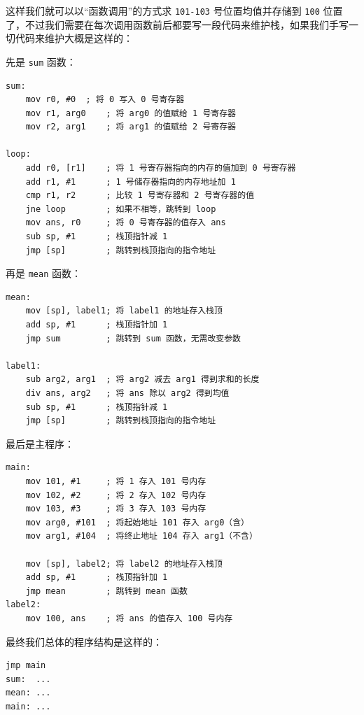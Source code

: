 这样我们就可以以“函数调用”的方式求 \texttt{101-103} 号位置均值并存储到 \texttt{100} 位置了，不过我们需要在每次调用函数前后都要写一段代码来维护栈，如果我们手写一切代码来维护大概是这样的：

先是 \texttt{sum} 函数：
\begin{verbatim}
sum:
    mov r0, #0  ; 将 0 写入 0 号寄存器
    mov r1, arg0    ; 将 arg0 的值赋给 1 号寄存器
    mov r2, arg1    ; 将 arg1 的值赋给 2 号寄存器

loop:
    add r0, [r1]    ; 将 1 号寄存器指向的内存的值加到 0 号寄存器
    add r1, #1      ; 1 号储存器指向的内存地址加 1
    cmp r1, r2      ; 比较 1 号寄存器和 2 号寄存器的值
    jne loop        ; 如果不相等，跳转到 loop
    mov ans, r0     ; 将 0 号寄存器的值存入 ans
    sub sp, #1      ; 栈顶指针减 1
    jmp [sp]        ; 跳转到栈顶指向的指令地址
\end{verbatim}

再是 \texttt{mean} 函数：
\begin{verbatim}
mean:
    mov [sp], label1; 将 label1 的地址存入栈顶
    add sp, #1      ; 栈顶指针加 1
    jmp sum         ; 跳转到 sum 函数，无需改变参数

label1:
    sub arg2, arg1  ; 将 arg2 减去 arg1 得到求和的长度
    div ans, arg2   ; 将 ans 除以 arg2 得到均值
    sub sp, #1      ; 栈顶指针减 1
    jmp [sp]        ; 跳转到栈顶指向的指令地址
\end{verbatim}

最后是主程序：
\begin{verbatim}
main:
    mov 101, #1     ; 将 1 存入 101 号内存
    mov 102, #2     ; 将 2 存入 102 号内存
    mov 103, #3     ; 将 3 存入 103 号内存
    mov arg0, #101  ; 将起始地址 101 存入 arg0（含）
    mov arg1, #104  ; 将终止地址 104 存入 arg1（不含）

    mov [sp], label2; 将 label2 的地址存入栈顶
    add sp, #1      ; 栈顶指针加 1
    jmp mean        ; 跳转到 mean 函数
label2:
    mov 100, ans    ; 将 ans 的值存入 100 号内存
\end{verbatim}

最终我们总体的程序结构是这样的：
\begin{verbatim}
jmp main
sum:  ...
mean: ...
main: ...
\end{verbatim}

